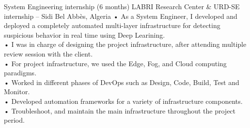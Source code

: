 \documentclass{cv}
\begin{document}
    {System Engineering internship (6 months)
    }
    {LABRI Research Center  \& URD-SE internship -- Sidi Bel Abbès, Algeria\vspace{.3cm}}
    {
      • As a System Engineer, I developed and deployed a completely automated multi-layer infrastructure 
      for detecting suspicious behavior in real time using Deep Learining.\\
      • I was in charge of designing the project infrastructure, after attending multiple review session 
      with the client.\\
      • For project infrastructure, we used the Edge, Fog, and Cloud computing paradigms.\\
      • Worked in different phases of DevOps such as Design, Code, Build, Test and Monitor.\\
      • Developed automation frameworks for a variety of infrastructure components.\\
      • Troubleshoot, and maintain the main infrastructure throughout the project period.\\
    }

\end{document}
